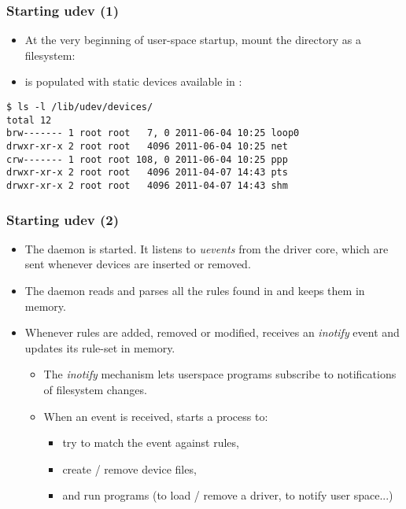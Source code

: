 \begin{frame}[fragile]
  \frametitle{Starting udev (1)}
  \begin{itemize}
  \item At the very beginning of user-space startup,
    mount the  directory as a  filesystem:\\
  \item {} is populated with static devices available in
    :
  \end{itemize}
  \begin{block}{}
\begin{verbatim}
$ ls -l /lib/udev/devices/
total 12
brw------- 1 root root   7, 0 2011-06-04 10:25 loop0
drwxr-xr-x 2 root root   4096 2011-06-04 10:25 net
crw------- 1 root root 108, 0 2011-06-04 10:25 ppp
drwxr-xr-x 2 root root   4096 2011-04-07 14:43 pts
drwxr-xr-x 2 root root   4096 2011-04-07 14:43 shm
\end{verbatim}
  \end{block}
\end{frame}

\begin{frame}
  \frametitle{Starting udev (2)}
  \begin{itemize}
  \item The  daemon is started.  It listens to {\em uevents}
    from the driver core, which are sent whenever devices are inserted
    or removed.
  \item The  daemon reads and parses all the rules found
    in  and keeps them in memory.
  \item Whenever rules are added, removed or modified, 
    receives an {\em inotify} event and updates its rule-set in memory.
    \begin{itemize}
    \item The {\em inotify} mechanism lets userspace programs
      subscribe to notifications of filesystem changes.
    \item When an event is received,  starts a process to:
      \begin{itemize}
      \item try to match the event against  rules,
      \item create / remove device files,
      \item and run programs (to load / remove a driver, to notify user
        space...)
      \end{itemize}
    \end{itemize}
  \end{itemize}
\end{frame}

